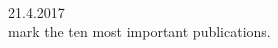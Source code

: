 \documentclass[12pt,a4]{report}
\begin{document}
\newcommand{\emp}[1]
{\it{#1}\rm}

\newenvironment{Body} %
 {\begin{list}{}{%
	\vspace{-0.6cm}
	\setlength{\leftmargin}{1.2cm}}
	  \item[]\ignorespaces}
 {\end{list}}


\vspace{-2cm}


 \\

 \hfill 21.4.2017\\


%
 mark the ten most important publications.
\vspace{0.3cm}


%

\vspace{0.3cm}





\vspace{0.4cm}

\end{document}
